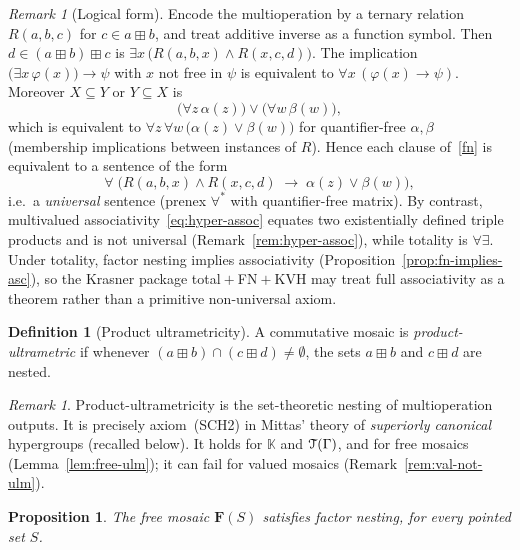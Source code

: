 \documentclass[11pt]{amsart}
\theoremstyle{plain}
\newtheorem{proposition}[theorem]{Proposition}
\theoremstyle{definition}
\newtheorem{definition}[theorem]{Definition}
\theoremstyle{remark}
\newtheorem{remark}[theorem]{Remark}
\newcommand{\T}{\EuScript{T}}
\begin{document}
\begin{remark}[Logical form]
\label{rem:fn-universal}
Encode the multioperation by a ternary relation \(R(a,b,c)\) for \(c\in a\boxplus b\), and treat additive inverse as a function symbol.
Then \(d\in(a\boxplus b)\boxplus c\) is \(\exists x\,\bigl(R(a,b,x)\land R(x,c,d)\bigr)\).
The implication \(\bigl(\exists x\,\varphi(x)\bigr)\to\psi\) with \(x\) not free in \(\psi\) is equivalent to \(\forall x\,(\varphi(x)\to\psi)\).
Moreover \(X\subseteq Y\) or \(Y\subseteq X\) is
\[
\bigl(\forall z\,\alpha(z)\bigr)\lor\bigl(\forall w\,\beta(w)\bigr),
\]
which is equivalent to \(\forall z\,\forall w\,\bigl(\alpha(z)\lor\beta(w)\bigr)\) for quantifier-free \(\alpha,\beta\) (membership implications between instances of \(R\)).
Hence each clause of~\eqref{fn} is equivalent to a sentence of the form
\[
\forall \;
\bigl(R(a,b,x)\land R(x,c,d)\;\to\;\alpha(z)\lor\beta(w)\bigr),
\]
i.e.\ a \emph{universal} sentence (prenex \(\forall^\ast\) with quantifier-free matrix).
By contrast, multivalued associativity~\eqref{eq:hyper-assoc} equates two existentially defined triple products and is not universal (Remark~\ref{rem:hyper-assoc}), while totality is \(\forall\exists\).
Under totality, factor nesting implies associativity (Proposition~\ref{prop:fn-implies-asc}), so the Krasner package total\({}+{}\)FN\({}+{}\)KVH may treat full associativity as a theorem rather than a primitive non-universal axiom.
\end{remark}

\begin{definition}[Product ultrametricity]
\label{def:ulm}
A commutative mosaic is \emph{product-ultrametric} if whenever \((a\boxplus b)\cap(c\boxplus d)\neq\emptyset\), the sets \(a\boxplus b\) and \(c\boxplus d\) are nested.
\end{definition}

\begin{remark}
\label{rem:ball-examples}
Product-ultrametricity is the set-theoretic nesting of multioperation outputs. It is precisely axiom~(SCH2) in Mittas' theory of \emph{superiorly canonical} hypergroups (recalled below). It holds for \(\mathbb{K}\) and \(\T(\Gamma)\), and for free mosaics (Lemma~\ref{lem:free-ulm}); it can fail for valued mosaics (Remark~\ref{rem:val-not-ulm}).
\end{remark}

\begin{proposition}
\label{prop:free-fn}
The free mosaic \(\mathbf{F}(S)\) satisfies factor nesting, for every pointed set \(S\).
\end{proposition}
\end{document}
